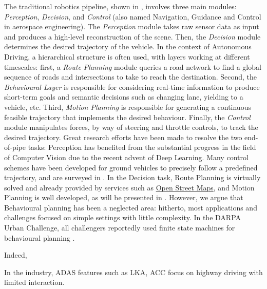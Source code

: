 The traditional robotics pipeline, shown in , involves three main modules: \emph{Perception}, \emph{Decision}, and \emph{Control} (also named Navigation, Guidance and Control in aerospace engineering). The \emph{Perception} module takes raw sensor data as input and produces a high-level reconstruction of the scene. Then, the \emph{Decision} module determines the desired trajectory of the vehicle. In the context of Autonomous Driving, a hierarchical structure is often used, with layers working at different timescales: first, a \emph{Route Planning} module queries a road network to find a global sequence of roads and intersections to take to reach the destination. Second, the \emph{Behavioural Layer} is responsible for considering real-time information to produce short-term goals and semantic decisions such as changing lane, yielding to a vehicle, etc. Third, \emph{Motion Planning} is responsible for generating a continuous feasible trajectory that implements the desired behaviour. Finally, the \emph{Control} module manipulates forces, by way of steering and throttle controls, to track the desired trajectory. Great research efforts have been made to resolve the two end-of-pipe tasks: Perception has benefited from the substantial progress in the field of Computer Vision due to the recent advent of Deep Learning. Many control schemes have been developed for ground vehicles to precisely follow a predefined trajectory, and are surveyed in \citep{Polack2018}.
In the Decision task, Route Planning is virtually solved and already provided by services such as \href{https://wiki.openstreetmap.org/wiki/Routing}{Open Street Maps}, and Motion Planning is well developed, as will be presented in . However, we argue that Behavioural planning has been a neglected area: hitherto, most applications and challenges focused on simple settings with little complexity. In the DARPA Urban Challenge, all challengers reportedly used finite state machines for behavioural planning \citep{Buehler2009}. 

Indeed, 

In the industry, ADAS features such as LKA, ACC focus on highway driving with limited interaction. 


